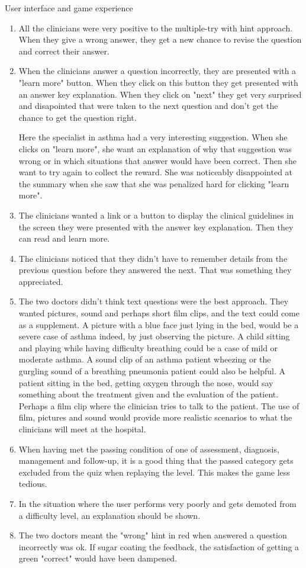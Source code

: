 User interface and game experience
 \begin{enumerate}
 	\item All the clinicians were very positive to the multiple-try with hint approach. When they give a wrong answer, they get a new chance to revise the question and correct their answer.
 	\item When the clinicians answer a question incorrectly, they are presented with a "learn more" button. When they click on this button they get presented with an answer key explanation. When they click on "next" they get very surprised and disapointed that were taken to the next question and don't get the chance to get the question right.
 	
 	Here the specialist in asthma had a very interesting suggestion. When she clicks on "learn more", she want an explanation of why that suggestion was wrong or in which situations that answer would have been correct. Then she want to try again to collect the reward. She was noticeably disappointed at the summary when she saw that she was penalized hard for clicking "learn more".
 	\item The clinicians wanted a link or a button to display the clinical guidelines in the screen they were presented with the answer key explanation. Then they can read and learn more.
 	\item The clinicians noticed that they didn't have to remember details from the previous question before they answered the next. That was something they appreciated.
 	\item The two doctors didn't think text questions were the best approach. They wanted pictures, sound and perhaps short film clips, and the text could come as a supplement. A picture with a blue face just lying in the bed, would be a severe case of asthma indeed, by just observing the picture. A child sitting and playing while having difficulty breathing could be a case of mild or moderate asthma. A sound clip of an asthma patient wheezing or the gurgling sound of a breathing pneumonia patient could also be helpful. A patient sitting in the bed, getting oxygen through the nose, would say something about the treatment given and the evaluation of the patient. Perhaps a film clip where the clinician tries to talk to the patient. The use of film, pictures and sound would provide more realistic scenarios to what the clinicians will meet at the hospital.
 	\item When having met the passing condition of one of assessment, diagnosis, management and follow-up, it is a good thing that the passed category gets excluded from the quiz when replaying the level. This makes the game less tedious.
 	\item In the situation where the user performs very poorly and gets demoted from a difficulty level, an explanation should be shown.
 	\item The two doctors meant the "wrong" hint in red when answered a question incorrectly was ok. If sugar coating the feedback, the satisfaction of getting a green "correct" would have been dampened.
 	
\end{enumerate}


